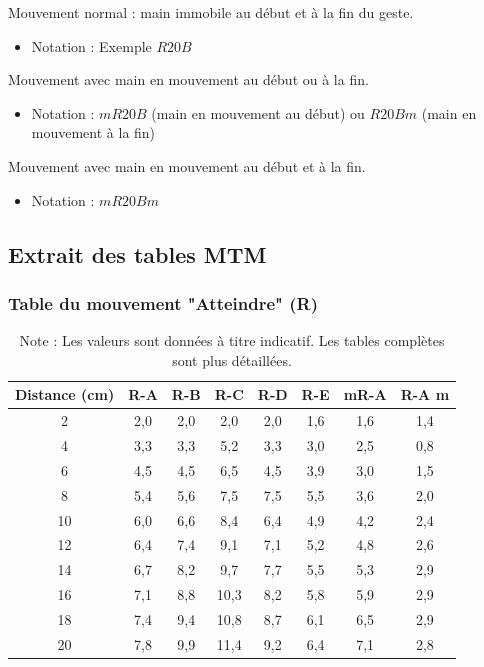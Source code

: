 \documentclass[a4paper,12pt]{article}
\begin{document}
\begin{description}[labelwidth=1.5cm]
    \item[Type I] Mouvement normal : main immobile au début et à la fin du geste.
    \begin{itemize}
        \item Notation : Exemple $R20B$
    \end{itemize}
    
    \item[Type II] Mouvement avec main en mouvement au début ou à la fin.
    \begin{itemize}
        \item Notation : $mR20B$ (main en mouvement au début) ou $R20Bm$ (main en mouvement à la fin)
    \end{itemize}
    
    \item[Type III] Mouvement avec main en mouvement au début et à la fin.
    \begin{itemize}
        \item Notation : $mR20Bm$
    \end{itemize}
\end{description}

\subsection{Extrait des tables MTM}

\subsubsection{Table du mouvement "Atteindre" (R)}

\begin{table}[ht]
\centering
\begin{tabular}{|c|c|c|c|c|c|c|c|}
\hline
\textbf{Distance (cm)} & \textbf{R-A} & \textbf{R-B} & \textbf{R-C} & \textbf{R-D} & \textbf{R-E} & \textbf{mR-A} & \textbf{R-A m} \\
\hline
2 & 2,0 & 2,0 & 2,0 & 2,0 & 1,6 & 1,6 & 1,4 \\
4 & 3,3 & 3,3 & 5,2 & 3,3 & 3,0 & 2,5 & 0,8 \\
6 & 4,5 & 4,5 & 6,5 & 4,5 & 3,9 & 3,0 & 1,5 \\
8 & 5,4 & 5,6 & 7,5 & 7,5 & 5,5 & 3,6 & 2,0 \\
10 & 6,0 & 6,6 & 8,4 & 6,4 & 4,9 & 4,2 & 2,4 \\
12 & 6,4 & 7,4 & 9,1 & 7,1 & 5,2 & 4,8 & 2,6 \\
14 & 6,7 & 8,2 & 9,7 & 7,7 & 5,5 & 5,3 & 2,9 \\
16 & 7,1 & 8,8 & 10,3 & 8,2 & 5,8 & 5,9 & 2,9 \\
18 & 7,4 & 9,4 & 10,8 & 8,7 & 6,1 & 6,5 & 2,9 \\
20 & 7,8 & 9,9 & 11,4 & 9,2 & 6,4 & 7,1 & 2,8 \\
\hline
\end{tabular}
\caption{Extrait de la table MTM pour le mouvement "Atteindre" (valeurs en TMU)}
\caption*{Note : Les valeurs sont données à titre indicatif. Les tables complètes sont plus détaillées.}
\end{table}
\end{document}
